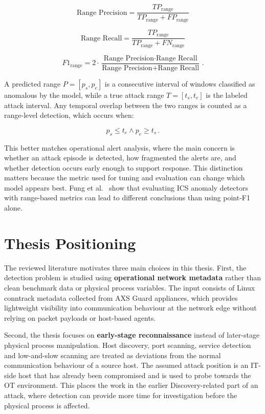 \begin{equation}
\text{Range Precision} = \frac{TP_{\text{range}}}{TP_{\text{range}} + FP_{\text{range}}}
\label{eq:range_precision}
\end{equation}

\begin{equation}
\text{Range Recall} = \frac{TP_{\text{range}}}{TP_{\text{range}} + FN_{\text{range}}}
\label{eq:range_recall}
\end{equation}

\begin{equation}
F1_{\text{range}} = 2 \cdot \frac{\text{Range Precision} \cdot \text{Range Recall}}{\text{Range Precision} + \text{Range Recall}}\, .
\label{eq:range_f1}
\end{equation}

A predicted range $P = [p_s, p_e]$ is a consecutive interval of windows
classified as anomalous by the model, while a true attack range $T = [t_s, t_e]$
is the labeled attack interval. Any temporal overlap between the two ranges is
counted as a range-level detection, which occurs when:

\begin{equation}
p_s \leq t_e \land p_e \geq t_s\, .
\label{eq:range_overlap}
\end{equation}

This better matches operational alert analysis, where the main concern is whether an attack episode is detected, how fragmented the alerts are, and whether detection occurs early enough to support response. This distinction matters because the metric used for tuning and evaluation can change which model appears best. Fung et al.~\cite{fung_perspectives_2022} show that evaluating ICS anomaly detectors with range-based metrics can lead to different conclusions than using point-F1 alone.


\section{Thesis Positioning}
The reviewed literature motivates three main choices in this thesis. First, the detection problem is studied using \textbf{operational network metadata} rather than clean benchmark data or physical process variables. The input consists of Linux conntrack metadata collected from AXS Guard appliances, which provides lightweight visibility into communication behaviour at the network edge without relying on packet payloads or host-based agents.

Second, the thesis focuses on \textbf{early-stage reconnaissance} instead of later-stage physical process manipulation. Host discovery, port scanning, service detection and low-and-slow scanning are treated as deviations from the normal communication behaviour of a source host. The assumed attack position is an IT-side host that has already been compromised and is used to probe towards the OT environment. This places the work in the earlier Discovery-related part of an attack, where detection can provide more time for investigation before the physical process is affected.

